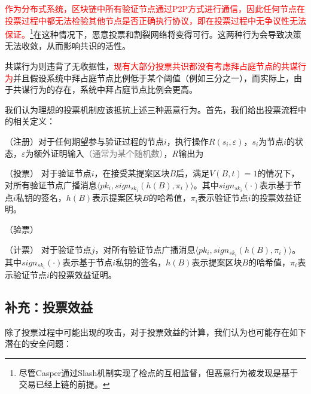 \textcolor{red}{作为分布式系统，区块链中所有验证节点通过P2P方式进行通信，因此任何节点在投票过程中都无法检验其他节点是否正确执行协议，即在投票过程中无争议性无法保证。}\footnote{尽管Casper通过Slash机制实现了检点的互相监督，但恶意行为被发现是基于交易已经上链的前提。}在这种情况下，恶意投票和割裂网络将变得可行。这两种行为会导致决策无法收敛，从而影响共识的活性。%

共谋行为则违背了无收据性，\textcolor{red}{现有大部分投票共识都没有考虑拜占庭节点的共谋行为}并且假设系统中拜占庭节点比例低于某个阈值（例如三分之一），而实际上，由于共谋行为的存在，系统中拜占庭节点比例会更高。

我们认为理想的投票机制应该抵抗上述三种恶意行为。首先，我们给出投票流程中的相关定义：

\begin{definition}
	（注册）对于任何期望参与验证过程的节点$i$，执行操作$R(s_i,\varepsilon)$，$s_i$为节点$i$的状态，$\varepsilon$为额外证明输入\textcolor{gray}{（通常为某个随机数）}，$R$输出为
\end{definition}

\begin{definition}
（投票） 对于验证节点$i$，在接受某提案区块$B$后，满足$V(B,t)=1$的情况下，对所有验证节点广播消息$\langle pk_i,sign_{sk_i}(h(B),\pi_i) \rangle$。其中$sign_{sk_i}(\cdot)$表示基于节点$i$私钥的签名，$h(B)$表示提案区块$B$的哈希值，$\pi_i$表示验证节点$i$的投票效益证明。
\end{definition}

\begin{definition}
	（验票）
\end{definition}

\begin{definition}
（计票） 对于验证节点$j$，对所有验证节点广播消息$\langle pk_i,sign_{sk_i}(h(B),\pi_i) \rangle$。其中$sign_{sk_i}(\cdot)$表示基于节点$i$私钥的签名，$h(B)$表示提案区块$B$的哈希值，$\pi_i$表示验证节点$i$的投票效益证明。
\end{definition}


\subsection{补充：投票效益}
除了投票过程中可能出现的攻击，对于投票效益的计算，我们认为也可能存在如下潜在的安全问题：


